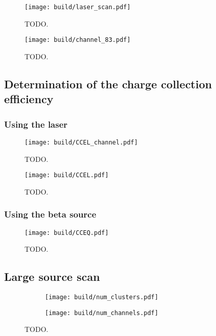 \begin{figure}[H]
  \centering
  \texttt{[image: build/laser\_scan.pdf]}
  \caption{TODO.}
  \label{fig:laser_scan}
\end{figure}

\begin{figure}[H]
  \centering
  \texttt{[image: build/channel\_83.pdf]}
  \caption{TODO.}
  \label{fig:channel_83}
\end{figure}

\subsection{Determination of the charge collection efficiency}

\subsubsection{Using the laser}

\begin{figure}[H]
  \centering
  \texttt{[image: build/CCEL\_channel.pdf]}
  \caption{TODO.}
  \label{fig:CCEL_channel}
\end{figure}

\begin{figure}[H]
  \centering
  \texttt{[image: build/CCEL.pdf]}
  \caption{TODO.}
  \label{fig:CCEL}
\end{figure}

\subsubsection{Using the beta source}

\begin{figure}[H]
  \centering
  \texttt{[image: build/CCEQ.pdf]}
  \caption{TODO.}
  \label{fig:CCEQ}
\end{figure}

\subsection{Large source scan}

\begin{figure}[H]
  \centering
    \begin{subfigure}{0.5\textwidth}
      \texttt{[image: build/num\_clusters.pdf]}
    \end{subfigure}
    \begin{subfigure}{0.5\textwidth}
      \texttt{[image: build/num\_channels.pdf]}
    \end{subfigure}
  \caption{TODO.}
  \label{fig:RS_histograms}
\end{figure}

